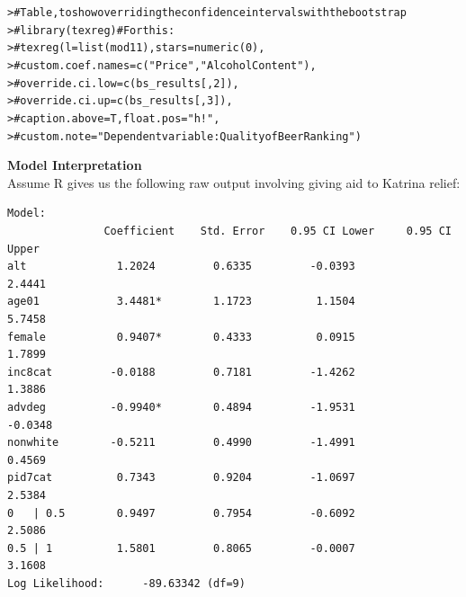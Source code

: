 \documentclass[12pt]{article}\usepackage[]{graphicx}\usepackage[]{color}
\makeatletter
\newcommand{\hlcom}[1]{\textcolor[rgb]{0.404,0.408,0.42}{#1}}%
\newcommand{\hlstd}[1]{\textcolor[rgb]{0.882,0.878,0.898}{#1}}%
\newenvironment{kframe}{%
 \def\at@end@of@kframe{}%
 \ifinner\ifhmode%
  \def\at@end@of@kframe{\end{minipage}}%
  \begin{minipage}{\columnwidth}%
 \fi\fi%
 \def\FrameCommand##1{\hskip\@totalleftmargin \hskip-\fboxsep
 \colorbox{shadecolor}{##1}\hskip-\fboxsep
     \hskip-\linewidth \hskip-\@totalleftmargin \hskip\columnwidth}%
 \MakeFramed {\advance\hsize-\width
   \@totalleftmargin\z@ \linewidth\hsize
   \@setminipage}}%
 {\par\unskip\endMakeFramed%
 \at@end@of@kframe}
\newenvironment{knitrout}{}{} %
\makeatother
\begin{document}
\begin{flushleft}
\begin{knitrout}
\begin{kframe}
{\ttfamily\noindent\bfseries\color{errorcolor}{\#\# Error in override(models = models, override.coef = override.coef, override.se = override.se, : object 'bs\_results' not found}}\begin{alltt}
\hlstd{> }\hlcom{# Table, to show overriding the confidence intervals with the bootstrap}
\hlstd{> }\hlcom{# library(texreg) # For this:}
\hlstd{> }\hlcom{# texreg(l= list(mod11), stars = numeric(0),}
\hlstd{> }\hlcom{#        custom.coef.names = c("Price", "Alcohol Content"),}
\hlstd{> }\hlcom{#        override.ci.low = c(bs_results[, 2]),}
\hlstd{> }\hlcom{#        override.ci.up = c(bs_results[, 3]),}
\hlstd{> }\hlcom{#        caption.above = T, float.pos = "h!",}
\hlstd{> }\hlcom{#        custom.note = "Dependent variable: Quality of Beer Ranking" )}
\end{alltt}
\end{kframe}
\end{knitrout}




\noindent \textbf{Model Interpretation} \\
Assume R gives us the following raw output involving giving aid to Katrina relief:
\begin{verbatim}
Model:
               Coefficient    Std. Error    0.95 CI Lower     0.95 CI Upper
alt              1.2024         0.6335         -0.0393            2.4441
age01            3.4481*        1.1723          1.1504            5.7458
female           0.9407*        0.4333          0.0915            1.7899
inc8cat         -0.0188         0.7181         -1.4262            1.3886
advdeg          -0.9940*        0.4894         -1.9531           -0.0348
nonwhite        -0.5211         0.4990         -1.4991            0.4569
pid7cat          0.7343         0.9204         -1.0697            2.5384
0   | 0.5        0.9497         0.7954         -0.6092            2.5086
0.5 | 1          1.5801         0.8065         -0.0007            3.1608
Log Likelihood:      -89.63342 (df=9)
\end{verbatim}


\end{flushleft}
\end{document}
